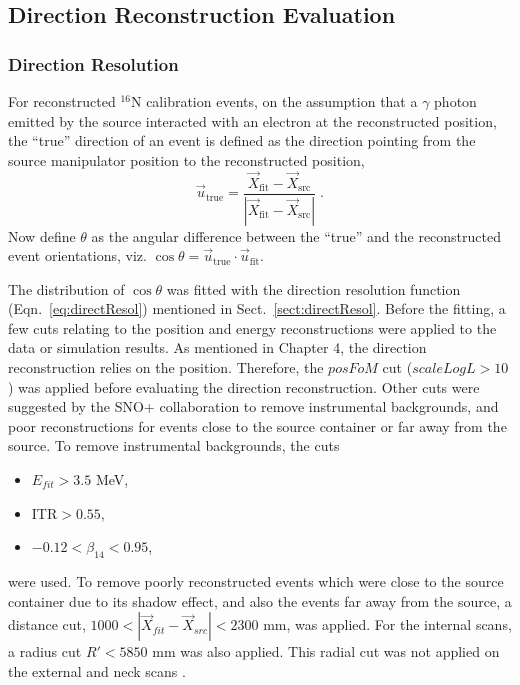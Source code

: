 
\subsection{Direction Reconstruction Evaluation}

\subsubsection{Direction Resolution}

For reconstructed $^{16}$N calibration events, on the assumption that a $\gamma$ photon emitted by the source interacted with an electron at the reconstructed position, the ``true'' direction of an event is defined as the direction pointing from the source manipulator position to the reconstructed position,
\begin{equation}
\vec{u}_{\mathrm{true}} = \frac{\vec{X}_{\mathrm{fit}}-\vec{X}_{\mathrm{src}}}{|\vec{X}_{\mathrm{fit}}-\vec{X}_\mathrm{src}|} \; .
\end{equation}
Now define $\theta$ as the angular difference between the ``true'' and the reconstructed event orientations, viz. $\cos\theta= \vec{u}_{\mathrm{true}} \cdot \vec{u}_{\mathrm{fit}}$.

The distribution of $\cos\theta$ was fitted with the direction resolution function (Eqn.~\ref{eq:directResol}) mentioned in Sect.~\ref{sect:directResol}. Before the fitting, a few cuts relating to the position and energy reconstructions were applied to the data or simulation results. As mentioned in Chapter 4, the direction reconstruction relies on the position. Therefore, the $posFoM$ cut ($scaleLogL>10$) was applied before evaluating the direction reconstruction. Other cuts were suggested by the SNO+ collaboration to remove instrumental backgrounds, and poor reconstructions for events close to the source container or far away from the source. To remove instrumental backgrounds, the cuts
\begin{itemize}
\item $E_{fit} > 3.5$ MeV\;,
\item ITR$>0.55$\;,
\item $-0.12<\beta_{14}<0.95$\;,
\end{itemize}
were used. To remove poorly reconstructed events which were close to the source container due to its shadow effect, and also the events far away from the source, a distance cut, $1000<|\vec{X}_{fit}-\vec{X}_{src}|<2300$ mm, was applied. For the internal scans, a radius cut $R'<5850$ mm was also applied. This radial cut was not applied on the external and neck scans \cite{waterunidoc}.

